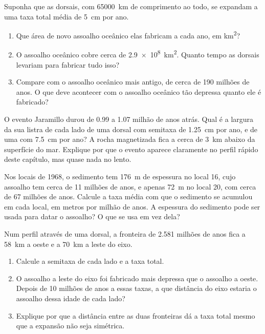 \begin{exercise}[$\star\star\star$]\label{exo:g11:drift-to-spreading:12}
Suponha que as dorsais, com \qty{65000}{km} de comprimento ao todo, se
expandam a uma taxa total média de \qty{5}{cm} por ano.
\begin{enumerate}
  \item Que área de novo assoalho oceânico elas fabricam a cada ano, em
        \unit{km^2}?
  \item O assoalho oceânico cobre cerca de \qty{2.9e8}{km^2}. Quanto tempo as
        dorsais levariam para fabricar tudo isso?
  \item Compare com o assoalho oceânico mais antigo, de cerca de \num{190}
        milhões de anos. O que deve acontecer com o assoalho oceânico tão
        depressa quanto ele é fabricado?
\end{enumerate}
\end{exercise}

\begin{exercise}[$\star\star\star$]\label{exo:g11:drift-to-spreading:13}
O evento Jaramillo durou de \num{0.99} a \num{1.07} milhão de anos atrás.
Qual é a largura da sua listra de cada lado de uma dorsal com semitaxa de
\qty{1.25}{cm} por ano, e de uma com \qty{7.5}{cm} por ano? A rocha
magnetizada fica a cerca de \qty{3}{km} abaixo da superfície do mar.
Explique por que o evento aparece claramente no perfil rápido deste
capítulo, mas quase nada no lento.
\end{exercise}

\begin{exercise}[$\star\star\star$]\label{exo:g11:drift-to-spreading:14}
Nos locais de 1968, o sedimento tem \qty{176}{m} de espessura no local 16,
cujo assoalho tem cerca de \num{11} milhões de anos, e apenas \qty{72}{m}
no local 20, com cerca de \num{67} milhões de anos. Calcule a taxa média com
que o sedimento se acumulou em cada local, em metros por milhão de anos. A
espessura do sedimento pode ser usada para datar o assoalho? O que se usa em
vez dela?
\end{exercise}

\begin{exercise}[$\star\star\star$]\label{exo:g11:drift-to-spreading:15}
Num perfil através de uma dorsal, a fronteira de \num{2.581} milhões de anos
fica a \qty{58}{km} a oeste e a \qty{70}{km} a leste do eixo.
\begin{enumerate}
  \item Calcule a semitaxa de cada lado e a taxa total.
  \item O assoalho a leste do eixo foi fabricado mais depressa que o
        assoalho a oeste. Depois de 10 milhões de anos a essas taxas, a que
        distância do eixo estaria o assoalho dessa idade de cada lado?
  \item Explique por que a distância entre as duas fronteiras dá a taxa
        total mesmo que a expansão não seja simétrica.
\end{enumerate}
\end{exercise}

